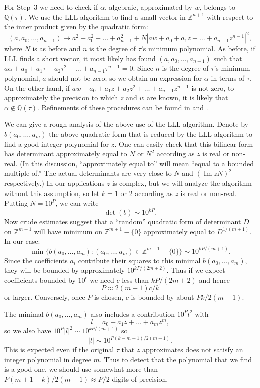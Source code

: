 \documentclass[a4paper]{amsart}
\def\Z{{\mathbb Z}}
\def\Q{{\mathbb Q}}
\theoremstyle{definition}
\begin{document}
For Step~3 we need to check if $\alpha$, algebraic, approximated by
$w$, belongs to $\Q(\tau)$. We use the LLL algorithm to find a small
vector in $\Z^{n+1}$ with respect to the inner product given by the 
quadratic form:
$$ 
(a,a_0,\ldots,a_{n-1}) \mapsto a^2 + a_0^2 + \ldots + a_{n-1}^2 + N
| aw + a_0 + a_1 z + \ldots + a_{n-1} z^{n-1} |^2, 
$$ 
where $N$ is as before and $n$ is the degree of $\tau$'s minimum
polynomial. As before, if LLL finds a short vector, 
it most likely has found $(a,a_0,\ldots,a_{n-1})$ such
that $a\alpha + a_0 + a_1 \tau + a_2 \tau^2 + \ldots + a_{n-1} \tau^{n-1} = 0$. 
Since $n$ is the degree of $\tau$'s minimum polynomial, $a$ should not
be zero; so we obtain an expression for $\alpha$ in terms of $\tau$. 
On the other hand, if $aw + a_0 + a_1 z + a_2 z^2 + \ldots + a_{n-1}
z^{n-1}$ is not zero, to approximately the precision to which $z$ and
$w$ are known, it is likely that $\alpha \not\in \Q(\tau)$.
Refinements of these procedures can be found in \cite{cohen} and \cite{pohst}. 

We can give a rough analysis of the above use of the LLL algorithm.
Denote by $b(a_0,\dots,a_m)$ the above quadratic form that is reduced
by the LLL algorithm to find a good integer polynomial for $z$.  One
can easily check that this bilinear form has determinant approximately
equal to $N$ or $N^2$ according as $z$ is real or non-real. (In this
discussion, ``approximately equal to'' will mean ``equal to a bounded
multiple of.'' The actual determinants are very close to $N$ and
$(\operatorname{Im}zN)^2$ respectively.)  In our applications $z$ is
complex, but we will analyze the algorithm without this assumption, so
let $k=1$ or $2$ according as $z$ is real or non-real.  Putting
$N=10^P$, we can write $$\det(b)\sim 10^{kP}.$$ Now crude estimates
suggest that a ``random'' quadratic form of determinant $D$ on
$\Z^{m+1}$ will have minimum on $\Z^{m+1}-\{0\}$ approximately equal
to $D^{1/(m+1)}$. In our case:
$$\min\{b(a_0,\dots,a_m):(a_0,\dots,a_m)\in\Z^{m+1}-\{0\}\}\sim
10^{kP/(m+1)}.$$ Since the coefficients $a_i$ contribute their squares
to this minimal $b(a_0,\dots,a_m)$, they will be bounded by
approximately $10^{kP/(2m+2)}$.  Thus if we expect coefficients
bounded by $10^c$ we need $c$ less than $kP/(2m+2)$ and hence
$$P\approx 2(m+1)c/k$$ or larger.  Conversely, once $P$ is chosen, $c$
is bounded by about $Pk/2(m+1)$.

The minimal $b(a_0,\dots,a_m)$ also includes a contribution $10^Pl^2$ with
$$l=a_0+a_1z+\dots+a_mz^m,$$
so we also have 
$10^P|l|^2\sim 10^{kP/(m+1)}$ so
$$|l|\sim 10^{P(k-m-1)/2(m+1)}.$$
This is expected even if the original $\tau$ that $z$ approximates
does not satisfy an integer polynomial in degree $m$.  Thus to detect
that the polynomial that we find is a good one, we should use somewhat
more than $P(m+1-k)/2(m+1)\approx P/2$ digits of precision. 
\end{document}
